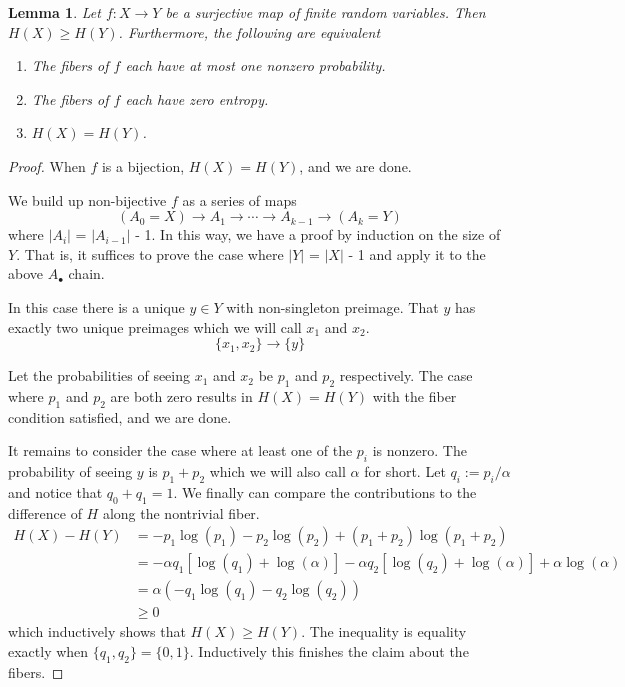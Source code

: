 \documentclass[12pt,a4paper]{article}
\newtheorem{lem}[thm]{Lemma}
\begin{document}
\begin{lem}
Let $f: X\rightarrow Y$ be a surjective map of finite random variables.  Then $H(X) \ge H(Y)$.  Furthermore, the following are equivalent
\begin{enumerate}
\item The fibers of $f$ each have at most one nonzero probability.
\item The fibers of $f$ each have zero entropy.
\item $H(X) = H(Y)$.
\end{enumerate}
\end{lem}
\begin{proof}
When $f$ is a bijection, $H(X) = H(Y)$, and we are done.  

We build up non-bijective $f$ as a series of maps
\[
  (A_0 = X) \rightarrow A_1 \rightarrow \cdots \rightarrow A_{k-1}  \rightarrow (A_k = Y)
\]
where $|A_i|$ = $|A_{i-1}|$ - 1.  In this way, we have a proof by induction on the size of $Y$.  That is, it suffices to prove the case where $|Y|$ = $|X|$ - 1 and apply it to the above $A_{\bullet}$ chain.

In this case there is a unique $y \in Y$ with non-singleton preimage.  That $y$ has exactly two unique preimages which we will call $x_1$ and $x_2$.
\[
  \{x_1,x_2\} \rightarrow \{y\}
\]

Let the probabilities of seeing $x_1$ and $x_2$ be $p_1$ and $p_2$ respectively.  The case where $p_1$ and $p_2$ are both zero results in $H(X) = H(Y)$ with the fiber condition satisfied, and we are done.

It remains to consider the case where at least one of the $p_i$ is nonzero.  The probability of seeing $y$ is $p_1 + p_2$ which we will also call $\alpha$ for short.  Let $q_i := p_i/\alpha$ and notice that $q_0 + q_1 = 1$.  We finally can compare the contributions to the difference of $H$ along the nontrivial fiber.
\[
\begin{split}
H(X) - H(Y) &= -p_1\log(p_1) - p_2 \log(p_2) + (p_1 + p_2) \log(p_1 + p_2) \\
            &= -\alpha q_1  \left[\log(q_1) + \log(\alpha)\right] - \alpha q_2 \left[\log(q_2) + \log(\alpha)\right] + \alpha \log(\alpha) \\
            &= \alpha (-q_1 \log(q_1) -q_2 \log(q_2)) \\
            &\ge 0
\end{split}
\]
which inductively shows that $H(X) \ge H(Y)$.  The inequality is equality exactly when $\{q_1,q_2\} = \{0,1\}$.  Inductively this finishes the claim about the fibers.
\end{proof}
\end{document}

